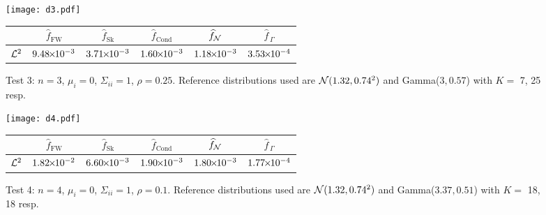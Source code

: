 

\begin{figure}[H]
\centering
\texttt{[image: d3.pdf]}

\vspace{4mm}

\begin{tabular}{c|c|c|c|c|c|}
\cline{2-6}
                         & $\widehat{f}_{\mathrm{FW}}$  & $\widehat{f}_{\mathrm{Sk}}$ & $\widehat{f}_{\mathrm{Cond}}$ & $\widehat{f}_{\mathcal{N}}$  & $\widehat{f}_{\,\Gamma}$ \\ \hline
\multicolumn{1}{|c|}{$\mathcal{L}^2$} & $9.48 {\mkern-2mu\times\mkern-2mu} 10^{-3}$ & $3.71 {\mkern-2mu\times\mkern-2mu} 10^{-3}$ & $1.60 {\mkern-2mu\times\mkern-2mu} 10^{-3}$ & $1.18 {\mkern-2mu\times\mkern-2mu} 10^{-3}$ & $3.53 {\mkern-2mu\times\mkern-2mu} 10^{-4}$ \\ \hline
\end{tabular}
\caption*{Test 3: $n=3$, $\mu_i = 0$, $\Sigma_{ii} = 1$, $\rho = 0.25$. Reference distributions used are $\mathcal{N}(1.32,0.74^2)$ and Gamma($3,0.57$) with $K =$ 7, 25 resp.}
\end{figure}



\begin{figure}[H]
\centering
\texttt{[image: d4.pdf]}

\vspace{4mm}

\begin{tabular}{c|c|c|c|c|c|}
\cline{2-6}
                         & $\widehat{f}_{\mathrm{FW}}$  & $\widehat{f}_{\mathrm{Sk}}$ & $\widehat{f}_{\mathrm{Cond}}$ & $\widehat{f}_{\mathcal{N}}$  & $\widehat{f}_{\,\Gamma}$ \\ \hline
\multicolumn{1}{|c|}{$\mathcal{L}^2$} & $1.82 {\mkern-2mu\times\mkern-2mu} 10^{-2}$ & $6.60 {\mkern-2mu\times\mkern-2mu} 10^{-3}$ & $1.90 {\mkern-2mu\times\mkern-2mu} 10^{-3}$ & $1.80 {\mkern-2mu\times\mkern-2mu} 10^{-3}$ & $1.77 {\mkern-2mu\times\mkern-2mu} 10^{-4}$ \\ \hline
\end{tabular}
\caption*{Test 4: $n=4$, $\mu_i = 0$, $\Sigma_{ii}=1$, $\rho = 0.1$. Reference distributions used are $\mathcal{N}(1.32,0.74^2)$ and Gamma($3.37,0.51$) with $K =$ 18, 18 resp.}
\end{figure}

